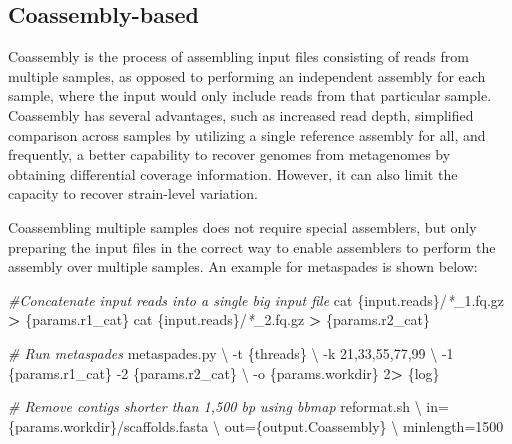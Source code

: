 \documentclass[
]{book}
\newenvironment{Shaded}{\begin{snugshade}}{\end{snugshade}}
\newcommand{\AttributeTok}[1]{\textcolor[rgb]{0.77,0.63,0.00}{#1}}
\newcommand{\CommentTok}[1]{\textcolor[rgb]{0.56,0.35,0.01}{\textit{#1}}}
\newcommand{\DataTypeTok}[1]{\textcolor[rgb]{0.13,0.29,0.53}{#1}}
\newcommand{\DecValTok}[1]{\textcolor[rgb]{0.00,0.00,0.81}{#1}}
\newcommand{\ExtensionTok}[1]{#1}
\newcommand{\FunctionTok}[1]{\textcolor[rgb]{0.00,0.00,0.00}{#1}}
\newcommand{\NormalTok}[1]{#1}
\newcommand{\OperatorTok}[1]{\textcolor[rgb]{0.81,0.36,0.00}{\textbf{#1}}}
\newcommand{\PreprocessorTok}[1]{\textcolor[rgb]{0.56,0.35,0.01}{\textit{#1}}}
\begin{document}
\hypertarget{coassembly-based}{%
\subsection*{Coassembly-based}\label{coassembly-based}}

Coassembly is the process of assembling input files consisting of reads from multiple samples, as opposed to performing an independent assembly for each sample, where the input would only include reads from that particular sample. Coassembly has several advantages, such as increased read depth, simplified comparison across samples by utilizing a single reference assembly for all, and frequently, a better capability to recover genomes from metagenomes by obtaining differential coverage information. However, it can also limit the capacity to recover strain-level variation.

Coassembling multiple samples does not require special assemblers, but only preparing the input files in the correct way to enable assemblers to perform the assembly over multiple samples. An example for metaspades is shown below:

\small

\begin{Shaded}
\begin{Highlighting}[]
\CommentTok{\#Concatenate input reads into a single big input file}
\FunctionTok{cat}\NormalTok{ \{input.reads\}/}\PreprocessorTok{*}\NormalTok{\_1.fq.gz }\OperatorTok{\textgreater{}}\NormalTok{ \{params.r1\_cat\}}
\FunctionTok{cat}\NormalTok{ \{input.reads\}/}\PreprocessorTok{*}\NormalTok{\_2.fq.gz }\OperatorTok{\textgreater{}}\NormalTok{ \{params.r2\_cat\}}

\CommentTok{\# Run metaspades}
\ExtensionTok{metaspades.py} \DataTypeTok{\textbackslash{}}
    \AttributeTok{{-}t}\NormalTok{ \{threads\} }\DataTypeTok{\textbackslash{}}
    \AttributeTok{{-}k}\NormalTok{ 21,33,55,77,99 }\DataTypeTok{\textbackslash{}}
    \AttributeTok{{-}1}\NormalTok{ \{params.r1\_cat\} }\AttributeTok{{-}2}\NormalTok{ \{params.r2\_cat\} }\DataTypeTok{\textbackslash{}}
    \AttributeTok{{-}o}\NormalTok{ \{params.workdir\}}
    \DecValTok{2}\OperatorTok{\textgreater{}}\NormalTok{ \{log\}}

\CommentTok{\# Remove contigs shorter than 1,500 bp using bbmap}
\ExtensionTok{reformat.sh} \DataTypeTok{\textbackslash{}}
\NormalTok{    in=\{params.workdir\}/scaffolds.fasta }\DataTypeTok{\textbackslash{}}
\NormalTok{    out=\{output.Coassembly\} }\DataTypeTok{\textbackslash{}}
\NormalTok{    minlength=1500}
\end{Highlighting}
\end{Shaded}
\end{document}
